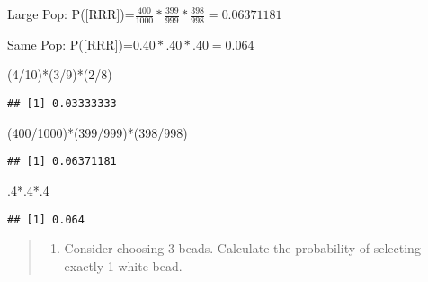 \documentclass[
]{article}
\newenvironment{Shaded}{\begin{snugshade}}{\end{snugshade}}
\newcommand{\DecValTok}[1]{\textcolor[rgb]{0.00,0.00,0.81}{#1}}
\newcommand{\NormalTok}[1]{#1}
\newcommand{\SpecialCharTok}[1]{\textcolor[rgb]{0.00,0.00,0.00}{#1}}
\providecommand{\tightlist}{%
  \setlength{\itemsep}{0pt}\setlength{\parskip}{0pt}}
\begin{document}
Large Pop:
P({[}RRR{]})=\(\frac{400}{1000}*\frac{399}{999}*\frac{398}{998}=0.06371181\)

Same Pop: P({[}RRR{]})=\(0.40*.40*.40=0.064\)

\begin{Shaded}
\begin{Highlighting}[]
\NormalTok{(}\DecValTok{4}\SpecialCharTok{/}\DecValTok{10}\NormalTok{)}\SpecialCharTok{*}\NormalTok{(}\DecValTok{3}\SpecialCharTok{/}\DecValTok{9}\NormalTok{)}\SpecialCharTok{*}\NormalTok{(}\DecValTok{2}\SpecialCharTok{/}\DecValTok{8}\NormalTok{)}
\end{Highlighting}
\end{Shaded}

\begin{verbatim}
## [1] 0.03333333
\end{verbatim}

\begin{Shaded}
\begin{Highlighting}[]
\NormalTok{(}\DecValTok{400}\SpecialCharTok{/}\DecValTok{1000}\NormalTok{)}\SpecialCharTok{*}\NormalTok{(}\DecValTok{399}\SpecialCharTok{/}\DecValTok{999}\NormalTok{)}\SpecialCharTok{*}\NormalTok{(}\DecValTok{398}\SpecialCharTok{/}\DecValTok{998}\NormalTok{)}
\end{Highlighting}
\end{Shaded}

\begin{verbatim}
## [1] 0.06371181
\end{verbatim}

\begin{Shaded}
\begin{Highlighting}[]
\NormalTok{.}\DecValTok{4}\SpecialCharTok{*}\NormalTok{.}\DecValTok{4}\SpecialCharTok{*}\NormalTok{.}\DecValTok{4}
\end{Highlighting}
\end{Shaded}

\begin{verbatim}
## [1] 0.064
\end{verbatim}

\begin{quote}
\begin{enumerate}
\def\labelenumi{\alph{enumi}.}
\tightlist
\item
  Consider choosing 3 beads. Calculate the probability of selecting
  exactly 1 white bead.
\end{enumerate}
\end{quote}
\end{document}
